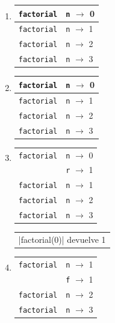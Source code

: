 \begin{enumerate}
\item {}
	\begin{tabular}{r|l|}
	\hline
	\currentframe \verb|factorial| & \verb|n| $\rightarrow$ 0 \\
	\hline
	\hline
	              \verb|factorial| & \verb|n| $\rightarrow$ 1 \\
	\hline
	\hline
	              \verb|factorial| & \verb|n| $\rightarrow$ 2 \\
	\hline
	\hline
	              \verb|factorial| & \verb|n| $\rightarrow$ 3 \\
	\hline
	\end{tabular}

\item {}
	\begin{tabular}{r|l|}
	\hline
	\currentframe \verb|factorial| & \verb|n| $\rightarrow$ 0 \\
	\hline
	\hline
	              \verb|factorial| & \verb|n| $\rightarrow$ 1 \\
	\hline
	\hline
	              \verb|factorial| & \verb|n| $\rightarrow$ 2 \\
	\hline
	\hline
	              \verb|factorial| & \verb|n| $\rightarrow$ 3 \\
	\hline
	\end{tabular}

\item {}
	\begin{tabular}{r|l|}
	\hline
	\currentframe \verb|factorial| & \verb|n| $\rightarrow$ 0 \\
	                               & \verb|r| $\rightarrow$ 1 \\
	\hline
	\hline
	              \verb|factorial| & \verb|n| $\rightarrow$ 1 \\
	\hline
	\hline
	              \verb|factorial| & \verb|n| $\rightarrow$ 2 \\
	\hline
	\hline
	              \verb|factorial| & \verb|n| $\rightarrow$ 3 \\
	\hline
	\end{tabular}
	\begin{tabular}{l}
    |factorial(0)| devuelve 1
	\end{tabular}

\item {}
	\begin{tabular}{r|l|}
	\hline
	\currentframe \verb|factorial| & \verb|n| $\rightarrow$ 1 \\
	                               & \verb|f| $\rightarrow$ 1 \\
	\hline
	\hline
	              \verb|factorial| & \verb|n| $\rightarrow$ 2 \\
	\hline
	\hline
	              \verb|factorial| & \verb|n| $\rightarrow$ 3 \\
	\hline
	\end{tabular}


\end{enumerate}
